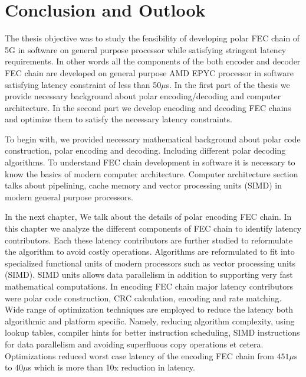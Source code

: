 \chapter{Conclusion and Outlook} \label{chap:conclusion}
The thesis objective was to study the feasibility of developing polar FEC chain of 5G in software on general purpose processor while satisfying stringent latency requirements. In other words all the components of the both encoder and decoder FEC chain are developed on general purpose AMD EPYC processor in software satisfying latency constraint of less than 50$\mu$s. In the first part of the thesis we provide necessary background about polar encoding/decoding and computer architecture. In the second part we develop encoding and decoding FEC chains and optimize them to satisfy the necessary latency constraints. \newline

To begin with, we provided necessary mathematical background about polar code construction, polar encoding and decoding. Including different polar decoding algorithms. To understand FEC chain development in software it is necessary to know the basics of modern computer architecture. Computer architecture section talks about pipelining, cache memory and vector processing units (SIMD) in modern general purpose processors. \newline

In the next chapter, We talk about the details of polar encoding FEC chain. In this chapter we analyze the different components of FEC chain to identify latency contributors. Each these latency contributors are further studied to reformulate the algorithm to avoid costly operations. Algorithms are reformulated to fit into specialized functional units of modern processors such as vector processing units (SIMD). SIMD units allows data parallelism in addition to supporting very fast mathematical computations. In encoding FEC chain major latency contributors were polar code construction, CRC calculation, encoding and rate matching. Wide range of optimization techniques are employed to reduce the latency both algorithmic and platform specific. Namely, reducing algorithm complexity, using lookup tables, compiler hints for better instruction scheduling, SIMD instructions for data parallelism and avoiding superfluous copy operations et cetera. Optimizations reduced worst case latency of the encoding FEC chain from $451 \mu$s to $40\mu$s which is more than 10x reduction in latency. \newline

